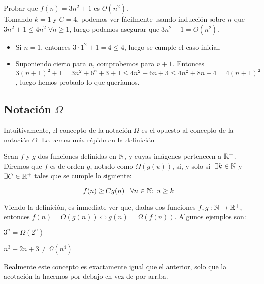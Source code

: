 \begin{ejemplo}
	Probar que $f(n) = 3n^2 + 1$ es $O(n^2)$.\\
	
	Tomando $k=1$ y $C=4$, podemos ver fácilmente usando inducción sobre $n$ que $3n^2 + 1 \leq 4n^2\;\forall n \geq 1$, luego podemos asegurar que $3n^2 + 1 = O(n^2)$.\\
	
	\begin{itemize}
		\item Si $n=1$, entonces $3 \cdot 1^2 + 1 = 4 \leq 4$, luego se cumple el caso inicial.
		\item Suponiendo cierto para $n$, comprobemos para $n + 1$. Entonces $3(n+1)^2 + 1 = 3n^2 + 6^n + 3 + 1 \leq 4n^2 + 6n + 3 \leq 4n^2 + 8n + 4 = 4(n+1)^2$, luego hemos probado lo que queríamos.
	\end{itemize}
\end{ejemplo}

\subsection{Notación $\Omega$}

Intuitivamente, el concepto de la notación $\Omega$ es el opuesto al concepto de la notación $O$. Lo vemos más rápido en la definición.

\begin{definicion}
	Sean $f$ y $g$ dos funciones definidas en $\mathbb{N}$, y cuyas imágenes pertenecen a $\mathbb{R}^+$. Diremos que $f$ es de orden $g$, notado como $\Omega(g(n))$, si, y solo si, $\exists k \in \mathbb{N}$ y $\exists C \in \mathbb{R}^+$ tales que se cumple lo siguiente:
	
	$$f(n) \geq Cg(n) \;\;\;\forall n \in \mathbb{N};\; n \geq k$$
\end{definicion}

Viendo la definición, es inmediato ver que, dadas dos funciones $f,g:\mathbb{N} \to \mathbb{R}^+$, entonces $f(n) = O(g(n)) \Leftrightarrow g(n) = \Omega(f(n))$. Algunos ejemplos son:

\begin{ejemplo}
	$3^n = \Omega(2^n)$
\end{ejemplo}

\begin{ejemplo}
	$n^3 + 2n + 3 \neq \Omega(n^4)$
\end{ejemplo}

Realmente este concepto es exactamente igual que el anterior, solo que la acotación la hacemos por debajo en vez de por arriba.

